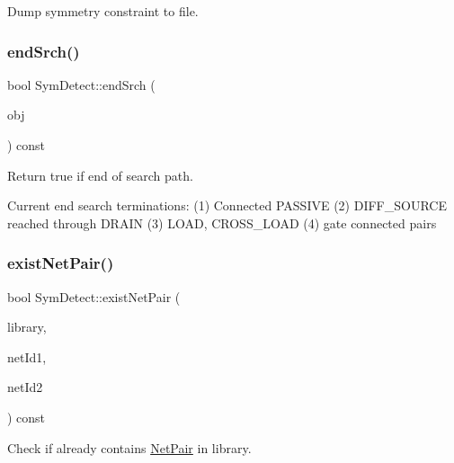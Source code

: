 Dump symmetry constraint to file. 

\mbox{\label{classSymDetect_ac46824a93f71489b6c9f1aec961a0f8d}} 
\subsubsection{\texorpdfstring{end\+Srch()}{endSrch()}}
{\footnotesize\ttfamily bool Sym\+Detect\+::end\+Srch (\begin{DoxyParamCaption}\item[{\hyperlink{classMosPair}{Mos\+Pair} \&}]{obj }\end{DoxyParamCaption}) const\hspace{0.3cm}{\ttfamily [private]}}



Return true if end of search path. 

Current end search terminations\+: (1) Connected P\+A\+S\+S\+I\+VE (2) D\+I\+F\+F\+\_\+\+S\+O\+U\+R\+CE reached through D\+R\+A\+IN (3) L\+O\+AD, C\+R\+O\+S\+S\+\_\+\+L\+O\+AD (4) gate connected pairs \mbox{\label{classSymDetect_a0e73f6d9d0b83b0c42c569fc42f8ecd2}} 
\subsubsection{\texorpdfstring{exist\+Net\+Pair()}{existNetPair()}\hspace{0.1cm}{\footnotesize\ttfamily [1/2]}}
{\footnotesize\ttfamily bool Sym\+Detect\+::exist\+Net\+Pair (\begin{DoxyParamCaption}\item[{std\+::vector$<$ \hyperlink{classNetPair}{Net\+Pair} $>$ \&}]{library,  }\item[{\hyperlink{type_8h_a581e8093e28e7362f2b6937296190676}{Index\+Type}}]{net\+Id1,  }\item[{\hyperlink{type_8h_a581e8093e28e7362f2b6937296190676}{Index\+Type}}]{net\+Id2 }\end{DoxyParamCaption}) const\hspace{0.3cm}{\ttfamily [private]}}



Check if already contains \hyperlink{classNetPair}{Net\+Pair} in library. 

